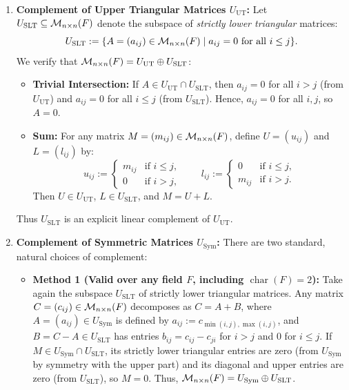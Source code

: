 \begin{exercisesolution*}
\label{sol:linear_complements_matrix_subspaces}
\begin{enumerate}[label=\textbf{(\alph*)}]
    \item \textbf{Complement of Upper Triangular Matrices $U_{\mathrm{UT}}$:}
    Let $U_{\mathrm{SLT}} \subseteq \mathcal{M}_{n \times n}(F)$ denote the subspace of \emph{strictly lower triangular} matrices:
    \[
    U_{\mathrm{SLT}} := \{A = (a_{ij}) \in \mathcal{M}_{n \times n}(F) \mid a_{ij} = 0 \text{ for all } i \le j\}.
    \]
    We verify that $\mathcal{M}_{n \times n}(F) = U_{\mathrm{UT}} \oplus U_{\mathrm{SLT}}$:
    \begin{itemize}
        \item \textbf{Trivial Intersection:} If $A \in U_{\mathrm{UT}} \cap U_{\mathrm{SLT}}$, then $a_{ij} = 0$ for all $i > j$ (from $U_{\mathrm{UT}}$) and $a_{ij} = 0$ for all $i \le j$ (from $U_{\mathrm{SLT}}$). Hence, $a_{ij} = 0$ for all $i, j$, so $A = 0$.
        \item \textbf{Sum:} For any matrix $M = (m_{ij}) \in \mathcal{M}_{n \times n}(F)$, define $U = (u_{ij})$ and $L = (l_{ij})$ by:
        \[
        u_{ij} := \begin{cases} m_{ij} & \text{if } i \le j, \\ 0 & \text{if } i > j, \end{cases}
        \qquad
        l_{ij} := \begin{cases} 0 & \text{if } i \le j, \\ m_{ij} & \text{if } i > j. \end{cases}
        \]
        Then $U \in U_{\mathrm{UT}}$, $L \in U_{\mathrm{SLT}}$, and $M = U + L$.
    \end{itemize}
    Thus $U_{\mathrm{SLT}}$ is an explicit linear complement of $U_{\mathrm{UT}}$.

    \item \textbf{Complement of Symmetric Matrices $U_{\mathrm{Sym}}$:}
    There are two standard, natural choices of complement:
    \begin{itemize}
        \item \textbf{Method 1 (Valid over any field $F$, including $\operatorname{char}(F) = 2$):}
        Take again the subspace $U_{\mathrm{SLT}}$ of strictly lower triangular matrices.
        Any matrix $C = (c_{ij}) \in \mathcal{M}_{n \times n}(F)$ decomposes as $C = A + B$, where $A = (a_{ij}) \in U_{\mathrm{Sym}}$ is defined by $a_{ij} := c_{\min(i,j), \max(i,j)}$, and $B = C - A \in U_{\mathrm{SLT}}$ has entries $b_{ij} = c_{ij} - c_{ji}$ for $i > j$ and $0$ for $i \le j$.
        If $M \in U_{\mathrm{Sym}} \cap U_{\mathrm{SLT}}$, its strictly lower triangular entries are zero (from $U_{\mathrm{Sym}}$ by symmetry with the upper part) and its diagonal and upper entries are zero (from $U_{\mathrm{SLT}}$), so $M = 0$. Thus, $\mathcal{M}_{n \times n}(F) = U_{\mathrm{Sym}} \oplus U_{\mathrm{SLT}}$.


\end{itemize}
\end{enumerate}
\end{exercisesolution*}
